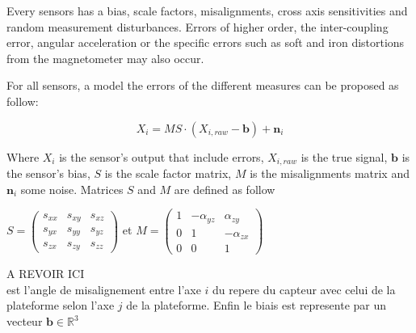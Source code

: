 Every sensors has a bias, scale factors, misalignments, cross axis sensitivities  and random measurement disturbances.  Errors of higher order, the inter-coupling error, angular acceleration or the specific errors such as soft and iron distortions from the magnetometer may also occur.

For all sensors, a model  the errors of the different measures can be proposed as follow:



\begin{equation}
	X_i = MS \cdot \left( X_{i,raw} - \textbf{b} \right) + \textbf{n}_i
\end{equation}

%

Where  $X_i$ is the sensor's output that include errors, $X_{i, raw}$ is the true signal, $\textbf{b}$ is the sensor's bias, $S$ is the scale factor matrix, $M$ is the misalignments matrix and $\textbf{n}_i$  some noise. Matrices $S$ and $M$ are defined as follow \\


\begin{center}
$S = \begin{pmatrix}  	s_{xx} & s_{xy} & s_{xz} \\ s_{yx} & s_{yy} & s_{yz} \\s_{zx} & s_{zy} & s_{zz}  \end{pmatrix}$ 	
 et
 $M = \begin{pmatrix}  1 & -\alpha_{yz} & \alpha_{zy} \\  0 & 1 & -\alpha_{zx} \\  0 & 0 & 1 \end{pmatrix} $
\end{center} 

\vspace{0.25cm}



A REVOIR ICI\\
est l'angle de misalignement entre l'axe $i$ du repere du capteur avec celui de la plateforme selon l'axe $j$ de la plateforme. Enfin le biais est represente par un vecteur $\textbf {b} \in \mathbb{R}^3$


